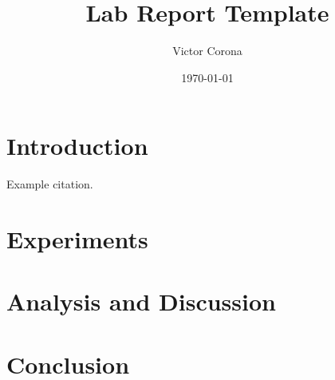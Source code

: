 \documentclass{article}
\title{Lab Report Template}
\author{Victor Corona}
\date{\today}
\begin{document}
\maketitle
\begin{abstract}
    
\end{abstract}

\section{Introduction}
Example citation\cite{Overleaf}.

\section{Experiments}

\section{Analysis and Discussion}

\section{Conclusion}

\printbibliography
\setlength{\parindent}{-0.2in}
\setlength{\leftskip}{0.2in}
\setlength{\parskip}{8pt}
\end{document}
